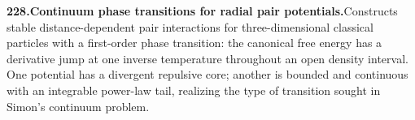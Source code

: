 \documentclass[11pt,a4paper]{article}
\begin{document}
  \par \begin{minipage}{\linewidth}
  \fontsize{10.5}{12.6}\selectfont\RaggedRight
  \hypertarget{result 228}{}
  {\bfseries\textcolor{muted}{228.}\enspace Continuum phase transitions for radial pair potentials.}\enspace Constructs stable distance-dependent pair interactions for three-dimensional classical particles with a first-order phase transition: the canonical free energy has a derivative jump at one inverse temperature throughout an open density interval. One potential has a divergent repulsive core; another is bounded and continuous with an integrable power-law tail, realizing the type of transition sought in Simon's continuum problem.\par
  \end{minipage}\par\vspace{5pt}
\end{document}
